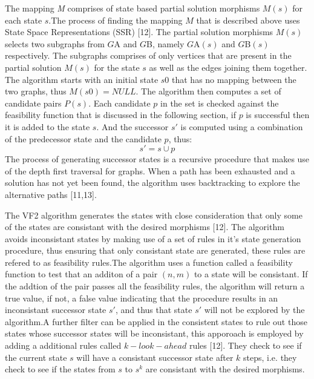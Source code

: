 The mapping \textit{M} comprises of state based partial solution morphisms $M(s)$ for each state $s$.The process of finding the mapping $M$ that is described above uses State Space Representations (SSR) [12].
The partial solution morphisms $M(s)$ selects two subgraphs from $G${\tiny A} and $G${\tiny B}, namely $G${\tiny A}$(s)$ and $G${\tiny B}$(s)$ respectively. The subgraphs comprises of only vertices that are present in the partial solution $M(s)$ for the state $s$ as well as the edges joining them together.\newline\newline
The algorithm starts with an initial state $s0$ that has no mapping between the two graphs, thus $M(s0)= NULL$. The algorithm then computes a set of candidate pairs $P(s)$. Each candidate $p$ in the set is checked against the feasibility function that is discussed in the following section, if $p$ is successful then it is added to the state $s$. And the successor $s'$ is computed using a combination of the predecessor state and the candidate $p$, thus:
      \begin{equation}
	      s' = s \cup p
      \end{equation}
The process of generating successor states is a recursive procedure that makes use of the depth first traversal for graphs. When a path has been 
exhausted and a solution has not yet been found, the algorithm uses backtracking to explore the alternative paths [11,13]. \newpage

The VF2 algorithm generates the states with close consideration that only some of the states are consistant with the desired morphisms [12]. The algorithm avoids inconsistant states by making use of a set of rules in it's state generation procedure, thus ensuring that only consistant state are generated, these rules are refered to as feasibility rules.\newline\newline The algorithm uses a function called a feasibility function to test that an additon of a pair $(n,m)$ to a state will be consistant. If the addtion of the pair passes all the feasibility rules, the algorithm will return a true value, if not, a false value indicating that the procedure results in an inconsistant successor  state $s'$, and thus that state $s'$ will not be explored by the algorithm.\newline\newline A further filter can be applied in the consistent states to rule out those states whose successor states will be inconsistant, this apporoach is employed by adding a additional rules called $k-look-ahead$ rules [12]. They check to see if the current state $s$ will have a consistant successor state after $k$ steps, i.e. they check to see if the states from $s$ to $s^k$ are consistant with the desired morphisms.

